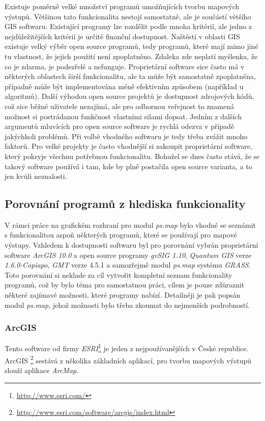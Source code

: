 \documentclass[a4paper,12pt,draft]{article}
\newcommand{\modul}[1]{\emph{#1}}
\begin{document}
Existuje poměrně velké množství programů umožňujících tvorbu
mapových výstupů. Většinou tato funkcionalita nestojí samostatně,
ale je součástí většího GIS softwaru. Existující programy lze
rozdělit podle mnoha kritérií, ale jedno z nejdůležitějších
kritérií je určitě finanční dostupnost. Naštěstí v oblasti GIS
existuje velký výběr open source programů, tedy programů, které mají mimo jiné
tu vlastnost, že jejich
použití není zpoplatněno. Zdaleka zde neplatí myšlenka, že co je
zdarma, je podezřelé a nefunguje. Proprietární software sice často má v
některých oblastech širší funkcionalitu, ale ta může být samostatně
zpoplatněna, případně může být implementována méně efektivním
způsobem (například u algoritmů). Další výhodou open source projektů
je dostupnost zdrojových kódů, což sice běžné uživatele nezajímá,
ale pro odbornou veřejnost to znamená možnost si postrádanou funkčnost
vlastními silami dopsat. Jedním z dalších argumentů mluvících pro open
source software je rychlá odezva v případě jakýchkoli problémů. Při
volbě vhodného softwaru je tedy třeba zvážit mnoho faktorů. Pro
velké projekty je často vhodnější si zakoupit proprietární software, který
pokryje všechnu potřebnou funkcionalitu. Bohužel se dnes často stává, že
se takový software používá i tam, kde by plně postačila
open source varianta, a to jen kvůli neznalosti.


\subsection{Porovnání  programů z hlediska funkcionality}
V rámci práce na grafickém rozhraní pro modul \modul{ps.map} bylo
vhodné se seznámit s funkcionalitou aspoň některých programů, které
se používají pro mapové výstupy. Vzhledem k dostupnosti softwaru byl
pro porovnání vybrán proprietární software \emph{ArcGIS 10.0} %
a open source programy \emph{gvSIG 1.10}, \emph{Quantum GIS} verze
\emph{1.6.0-Copiapo}, \emph{GMT} verze 4.5.1 a samozřejmě modul \modul{ps.map}
systému \emph{GRASS}.
Toto porovnání si neklade za cíl vytvořit kompletní seznam
funkcionality programů, což by bylo téma pro samostatnou práci,
cílem je pouze zdůraznit některé zajímavé možnosti, které programy
nabízí. Detailněji je pak popsán modul \modul{ps.map}, jehož možnosti
bylo třeba zkoumat do nejmenších podrobností.

\subsubsection{ArcGIS}
\label{sec:porovnani_moznosti:ArcGIS}
Tento software od firmy \emph{ESRI}\footnote{\url{http://www.esri.com/}} je
jeden z nejpoužívanějších v
České republice. ArcGIS
\footnote{\url{http://www.esri.com/software/arcgis/index.html}} sestává z
několika základních aplikací,
pro tvorbu mapových výstupů slouží aplikace \emph{ArcMap}.
\end{document}
